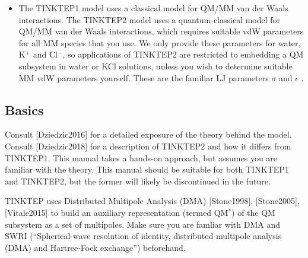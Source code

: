 \documentclass[letterpaper,10pt,english]{sphinxmanual}
\begin{document}
\begin{itemize}
\item {} 
The TINKTEP1 model uses a classical model for QM/MM van der Waals
interactions. The TINKTEP2 model uses a quantum-classical model for
QM/MM van der Waals interactions, which requires suitable vdW
parameters for all MM species that you use. We only provide these
parameters for water, K\(^{+}\) and Cl\(^{-}\), so
applications of TINKTEP2 are restricted to embedding a QM subsystem
in water or KCl solutions, unless you wish to determine suitable MM
vdW parameters yourself. These are  the familiar LJ parameters
\(\sigma\) and \(\epsilon\) .

\end{itemize}


\subsection{Basics}
\label{\detokenize{tinktep:basics}}
Consult {[}Dziedzic2016{]} for a detailed exposure of the
theory behind the model. Consult {[}Dziedzic2018{]} for a
description of TINKTEP2 and how it differs from TINKTEP1. This manual
takes a hands-on approach, but assumes you are familiar with the theory.
This manual should be suitable for both TINKTEP1 and TINKTEP2, but the
former will likely be discontinued in the future.

TINKTEP uses Distributed Multipole Analysis
(DMA) {[}Stone1998{]}, {[}Stone2005{]}, {[}Vitale2015{]} to build an auxiliary
representation (termed QM\(^*\)) of the QM subsystem as a set of
multipoles. Make sure you are famliar with DMA and SWRI (“Spherical-wave
resolution of identity, distributed multipole analysis (DMA) and
Hartree-Fock exchange”) beforehand.
\end{document}
